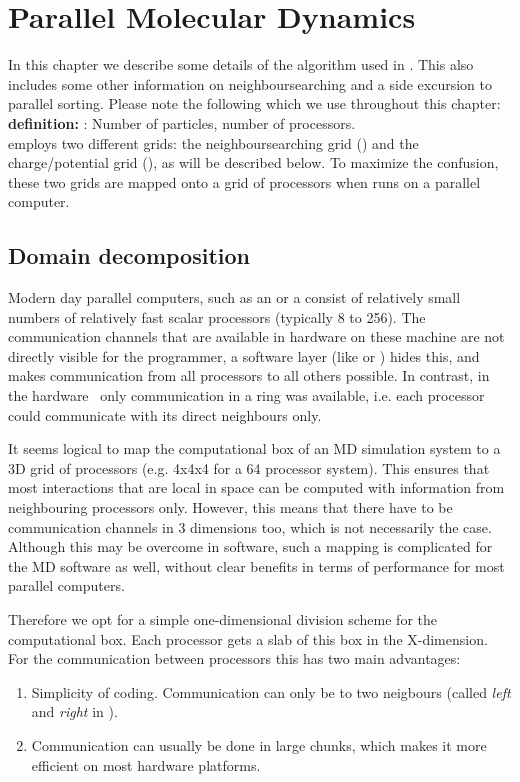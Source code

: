 \section{Parallel Molecular Dynamics}
In this chapter we describe some details of the   
algorithm used 
in {\gromacs}. This also includes some other information on neighboursearching and
a side excursion to parallel sorting.
Please note the following which we use throughout this chapter:\\
{\bf definition:} {\natom}: Number of particles, {\nproc} number of processors.\\
{\gromacs} employs two different grids: the neighboursearching grid ({\nsgrid})
and the charge/potential grid ({\fftgrid}), as will be described below.
To maximize the confusion, 
these two grids are mapped onto a grid of processors when {\gromacs} runs on a 
parallel computer.

\subsection{Domain decomposition}
Modern day parallel computers, such as an  or a
 consist of relatively
small numbers of relatively fast scalar processors (typically 8 to 256).
The communication channels that are available in hardware on these machine are
not directly visible for the programmer, a software layer (like  or 
) hides this, and makes communication from all processors to all
others possible. In contrast, in the {\gromacs} hardware~\cite{Berendsen95a}
only communication in a ring was available, i.e. each processor could communicate
with its direct neighbours only.

It seems logical to map the computational box of an MD simulation system 
to a 3D grid of 
processors (e.g. 4x4x4 for a 64 processor system). This ensures that most 
interactions that are local in space can be computed with information from 
neighbouring processors only. However, this means that there have to be
communication channels in 3 dimensions too, which is not necessarily the case.
Although this may be overcome in software, such a mapping is complicated for the MD
software as well, without clear benefits in terms of performance for most
parallel computers. 

Therefore we opt for a simple one-dimensional division scheme
for the computational box. Each processor gets a slab of this box in the 
X-dimension.
For the communication between processors this has two main advantages:
\begin{enumerate}
\item	Simplicity of coding. Communication can only be to two neigbours
	(called {\em left} and {\em right} in {\gromacs}).
\item	Communication can usually be done in large chunks, which makes it
	more efficient on most hardware platforms.
\end{enumerate}

